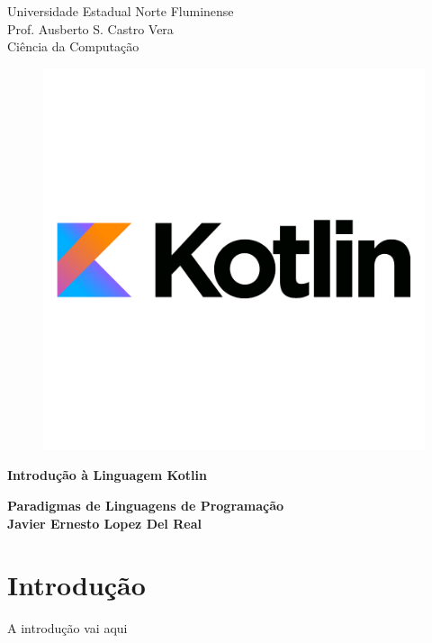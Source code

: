 \documentclass[11pt]{../classes/ifscarticle}
\begin{document}
\begin{center}
    
    {\large Universidade Estadual Norte Fluminense}\\[0.2cm] %
    {\large Prof. Ausberto S. Castro Vera  }\\[0.2cm] %
    {\large Ciência da Computação}\\[2.2cm]
    \begin{figure}[ht]
        \centering
        \includegraphics[width=.6\linewidth]{images/kotlin-logo.png}\\[2cm]
    \end{figure}
    
    {\Huge \bfseries Introdução à Linguagem Kotlin}

    \vspace{.5cm}

    {\large \bfseries Paradigmas de Linguagens de Programação}\\[2.2cm]
    
    {\LARGE \bfseries Javier Ernesto Lopez Del Real}
\end{center}

\clearpage

\pagestyle{firstpage}


\tableofcontents
\clearpage


\section{Introdução}
\label{sec:introducao}

A introdução vai aqui
\end{document}
